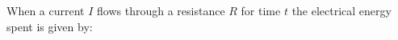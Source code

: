 When a current $I$ flows through a resistance $R$ for time $t$ 
the electrical energy spent is given by: